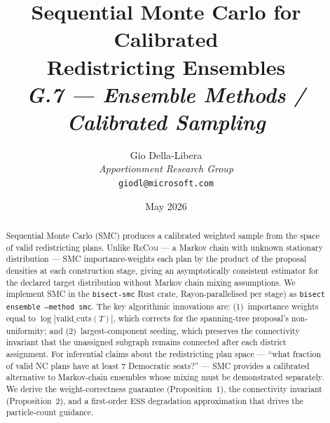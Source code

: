 \documentclass[12pt]{article}
\title{%
  \textbf{Sequential Monte Carlo for Calibrated}\\
  \textbf{Redistricting Ensembles}\\[0.8em]
  \normalsize\textit{G.7 --- Ensemble Methods / Calibrated Sampling}%
}
\author{%
  Gio Della-Libera\\
  \textit{Apportionment Research Group}\\
  \small\texttt{giodl@microsoft.com}
}
\date{May 2026}
\newcommand{\smc}{\textsc{SMC}}
\newcommand{\recom}{\textsc{ReCom}}
\newcommand{\ess}{\ensuremath{\mathrm{ESS}}}
\begin{document}
\maketitle

\begin{abstract}
\noindent
Sequential Monte Carlo (\smc{}) produces a calibrated weighted sample from the
space of valid redistricting plans.
Unlike \recom{} --- a Markov chain with unknown stationary distribution ---
\smc{} importance-weights each plan by the product of the proposal densities at
each construction stage, giving an asymptotically consistent estimator for the
declared target distribution without Markov chain mixing assumptions.
We implement \smc{} in the \texttt{bisect-smc} Rust crate,
Rayon-parallelised per stage) as \texttt{bisect ensemble --method smc}.
The key algorithmic innovations are: (1)~importance weights equal to
$\log|\mathrm{valid\_cuts}(T)|$, which corrects for the spanning-tree
proposal's non-uniformity; and (2)~largest-component seeding, which preserves
the connectivity invariant that the unassigned subgraph remains connected after
each district assignment.
For inferential claims about the redistricting plan space --- ``what fraction
of valid NC plans have at least 7 Democratic seats?'' --- \smc{} provides a
calibrated alternative to Markov-chain ensembles whose mixing must be
demonstrated separately.
We derive the weight-correctness guarantee (Proposition~1), the connectivity
invariant (Proposition~2), and a first-order \ess{} degradation approximation
that drives the particle-count guidance.
\end{abstract}

\tableofcontents
\newpage










\end{document}
